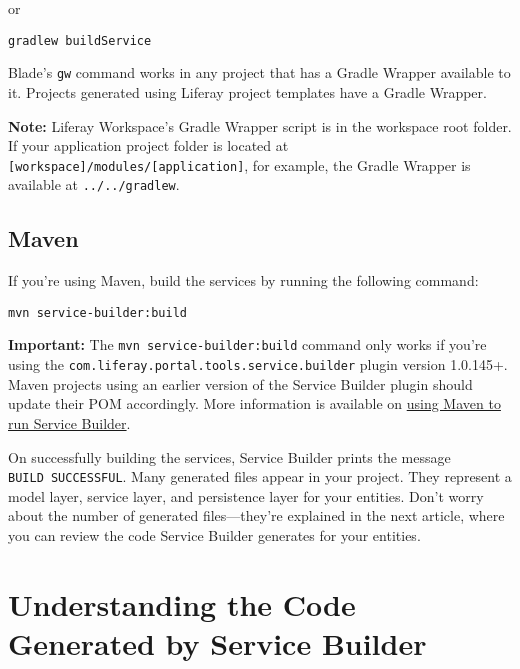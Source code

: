 or

\begin{verbatim}
gradlew buildService
\end{verbatim}

Blade's \texttt{gw} command works in any project that has a Gradle
Wrapper available to it. Projects generated using Liferay project
templates have a Gradle Wrapper.

\noindent\hrulefill

\textbf{Note:} Liferay Workspace's Gradle Wrapper script is in the
workspace root folder. If your application project folder is located at
\texttt{{[}workspace{]}/modules/{[}application{]}}, for example, the
Gradle Wrapper is available at \texttt{../../gradlew}.

\noindent\hrulefill

\section{Maven}\label{maven}

If you're using Maven, build the services by running the following
command:

\begin{verbatim}
mvn service-builder:build
\end{verbatim}

\textbf{Important:} The \texttt{mvn\ service-builder:build} command only
works if you're using the
\texttt{com.liferay.portal.tools.service.builder} plugin version
1.0.145+. Maven projects using an earlier version of the Service Builder
plugin should update their POM accordingly. More information is
available on
\href{/docs/7-2/reference/-/knowledge_base/r/using-service-builder-in-a-maven-project}{using
Maven to run Service Builder}.

On successfully building the services, Service Builder prints the
message \texttt{BUILD\ SUCCESSFUL}. Many generated files appear in your
project. They represent a model layer, service layer, and persistence
layer for your entities. Don't worry about the number of generated
files---they're explained in the next article, where you can review the
code Service Builder generates for your entities.

\chapter{Understanding the Code Generated by Service
Builder}\label{understanding-the-code-generated-by-service-builder}

